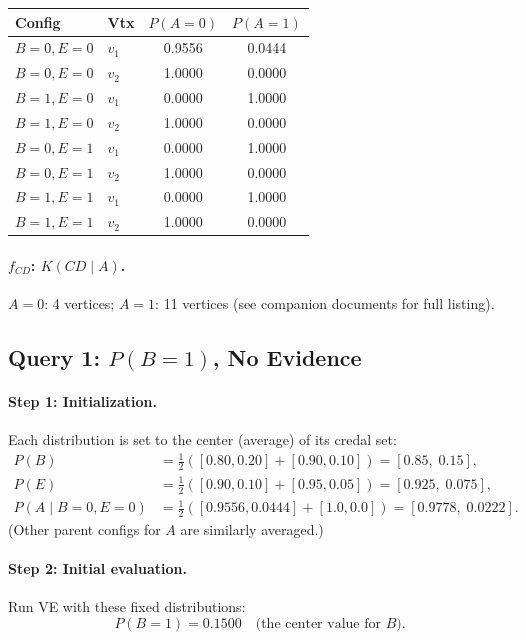 \documentclass[11pt]{article}
\begin{document}
\begin{center}
\begin{tabular}{llcc}
\toprule
\textbf{Config} & \textbf{Vtx} & $P(A{=}0)$ & $P(A{=}1)$ \\
\midrule
$B{=}0, E{=}0$ & $v_1$ & 0.9556 & 0.0444 \\
$B{=}0, E{=}0$ & $v_2$ & 1.0000 & 0.0000 \\
\midrule
$B{=}1, E{=}0$ & $v_1$ & 0.0000 & 1.0000 \\
$B{=}1, E{=}0$ & $v_2$ & 1.0000 & 0.0000 \\
\midrule
$B{=}0, E{=}1$ & $v_1$ & 0.0000 & 1.0000 \\
$B{=}0, E{=}1$ & $v_2$ & 1.0000 & 0.0000 \\
\midrule
$B{=}1, E{=}1$ & $v_1$ & 0.0000 & 1.0000 \\
$B{=}1, E{=}1$ & $v_2$ & 1.0000 & 0.0000 \\
\bottomrule
\end{tabular}
\end{center}

\paragraph{$f_{CD}$: $K(CD \mid A)$.} $A{=}0$: 4 vertices; $A{=}1$: 11 vertices (see companion documents for full listing).

\subsection{Query 1: $P(B{=}1)$, No Evidence}

\paragraph{Step 1: Initialization.}
Each distribution is set to the center (average) of its credal set:
\begin{align*}
  P(B) &= \tfrac{1}{2}([0.80, 0.20] + [0.90, 0.10]) = [0.85,\; 0.15], \\
  P(E) &= \tfrac{1}{2}([0.90, 0.10] + [0.95, 0.05]) = [0.925,\; 0.075], \\
  P(A \mid B{=}0, E{=}0) &= \tfrac{1}{2}([0.9556, 0.0444] + [1.0, 0.0]) = [0.9778,\; 0.0222].
\end{align*}
(Other parent configs for $A$ are similarly averaged.)

\paragraph{Step 2: Initial evaluation.}
Run VE with these fixed distributions:
\[
  P(B{=}1) = 0.1500 \quad \text{(the center value for $B$).}
\]
\end{document}
